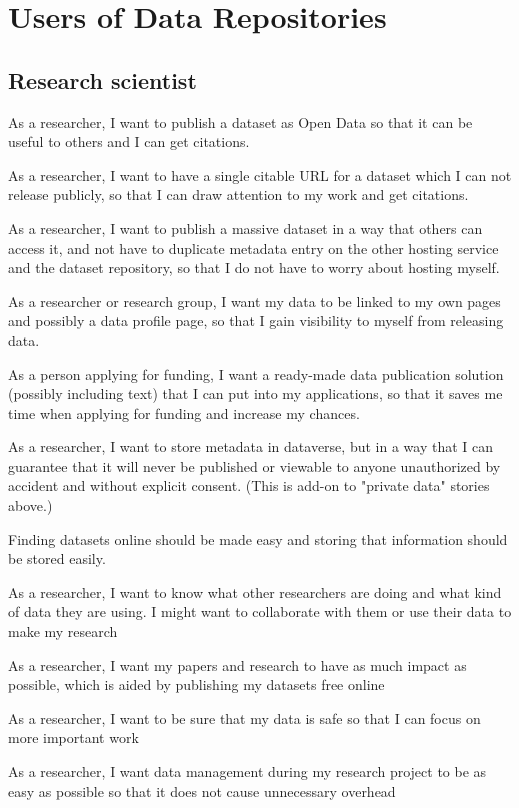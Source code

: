 \chapter{Users of Data Repositories}
\label{chapter:first-appendix}

\footnotesize

\section{Research scientist}

\begin{compactitem}
    \item As a researcher, I want to publish a dataset as Open Data so that it
          can be useful to others and I can get citations.
    \item As a researcher, I want to have a single citable URL for a dataset
          which I can not release publicly, so that I can draw attention to my
          work and get citations. 
    \item As a researcher, I want to publish a massive dataset in a way that
          others can access it, and not have to duplicate metadata entry on the
          other hosting service and the dataset repository, so that I do not have
          to worry about hosting myself. 
    \item As a researcher or research group, I want my data to be linked to my
          own pages and possibly a data profile page, so that I gain visibility
          to myself from releasing data. 
    \item As a person applying for funding, I want a ready-made data publication
          solution (possibly including text) that I can put into my
          applications, so that it saves me time when applying for funding and
          increase my chances. 
    \item As a researcher, I want to store metadata in dataverse, but in a way
          that I can guarantee that it will never be published or viewable to
          anyone unauthorized by accident and without explicit consent.  (This
          is add-on to "private data" stories above.)
    \item Finding datasets online should be made easy and storing that information
          should be stored easily.
    \item As a researcher, I want to know what other researchers are doing and
          what kind of data they are using. I might want to collaborate with
          them or use their data to make my research
    \item As a researcher, I want my papers and research to have as much impact
          as possible, which is aided by publishing my datasets free online
    \item As a researcher, I want to be sure that my data is safe so that I can
          focus on more important work
    \item As a researcher, I want data management during my research project to
          be as easy as possible so that it does not cause unnecessary overhead
\end{compactitem}

